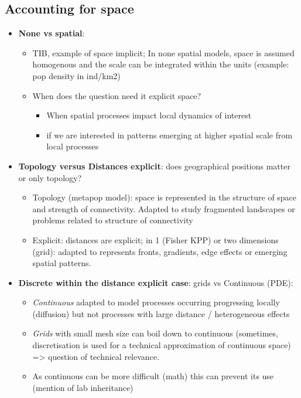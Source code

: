 \documentclass[
]{book}
\providecommand{\tightlist}{%
  \setlength{\itemsep}{0pt}\setlength{\parskip}{0pt}}
\theoremstyle{definition}
\theoremstyle{definition}
\theoremstyle{definition}
\theoremstyle{definition}
\theoremstyle{remark}
\begin{document}
\subsection{Accounting for space}\label{accounting-for-space}

\begin{itemize}
\tightlist
\item
  \textbf{None vs spatial}:

  \begin{itemize}
  \tightlist
  \item
    TIB, example of space implicit; In none spatial models, space is assumed homogenous and the scale can be integrated within the units (example: pop density in ind/km2)
  \item
    When does the question need it explicit space?

    \begin{itemize}
    \tightlist
    \item
      When spatial processes impact local dynamics of interest
    \item
      if we are interested in patterns emerging at higher spatial scale from local processes
    \end{itemize}
  \end{itemize}
\item
  \textbf{Topology versus Distances explicit}: does geographical positions matter or only topology?

  \begin{itemize}
  \tightlist
  \item
    Topology (metapop model): space is represented in the structure of space and strength of connectivity. Adapted to study fragmented landscapes or problems related to structure of connectivity
  \item
    Explicit: distances are explicit; in 1 (Fisher KPP) or two dimensions (grid): adapted to represents fronts, gradients, edge effects or emerging spatial patterns.
  \end{itemize}
\item
  \textbf{Discrete within the distance explicit case}: grids vs Continuous (PDE):

  \begin{itemize}
  \tightlist
  \item
    \emph{Continuous} adapted to model processes occurring progressing locally (diffusion) but not processes with large distance / heterogeneous effects
  \item
    \emph{Grids} with small mesh size can boil down to continuous (sometimes, discretisation is used for a technical approximation of continuous space) =\textgreater{} question of technical relevance.
  \item
    As continuous can be more difficult (math) this can prevent its use (mention of lab inheritance)
  \end{itemize}
\end{itemize}
\end{document}
